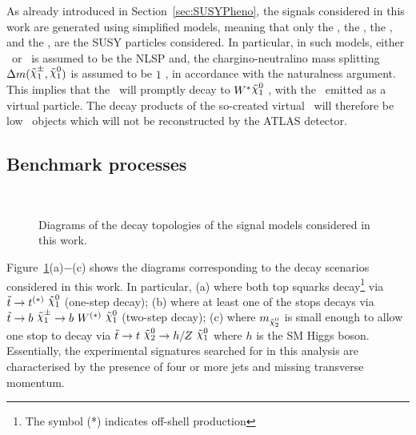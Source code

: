 		As already introduced in Section~\ref{sec:SUSYPheno}, the signals considered in this work are generated using simplified models, meaning that only the \stop, the \ninoone, the \ninotwo, and the \chinoonepm, are the \ac{SUSY} particles considered. In particular, in such models, either \ninotwo\ or \chinoonepm\ is assumed to be the \ac{NLSP} and, the chargino-neutralino mass splitting $\Delta m(\chinoonepm, \ninoone)$ is assumed to be $1$ \GeV, in accordance with the naturalness argument. This implies that the \chinoonepm\ will promptly decay to $\Wboson^*\ninoone$ , with the \Wboson\ emitted as a virtual particle. The decay products of the so-created virtual \Wboson\ will therefore be low \pt\ objects which will not be reconstructed by the \ac{ATLAS} detector. 

		\subsection{Benchmark processes}

			\begin{figure}[!htb]
				\centering
					\hspace{0.05\textwidth}
					\hspace{0.05\textwidth}
					\hspace{0.05\textwidth}\\
				\caption{Diagrams of the decay topologies of the signal models considered in this work.}
				\label{fig:stopModels}
			\end{figure}

			Figure~\ref{fig:stopModels}(a)$-$(c) shows the diagrams corresponding to the decay scenarios considered in this work. In particular, (a) where both top squarks decay\footnote{The symbol (*) indicates off-shell production} via $\stop\rightarrow t^{(*)}\ \ninoone$ (one-step decay); (b) where at least one of the stops decays via $\stop\rightarrow b\ \chinoonepm \rightarrow b\ \Wboson^{(*)}\ \ninoone$ (two-step decay); (c) where $m_{\ninotwo}$ is small enough to allow one stop to decay via $\stop\to t\ \ninotwo \to h/Z\ \ninoone$ where $h$ is the \ac{SM} Higgs boson. Essentially, the experimental signatures searched for in this analysis are characterised by the presence of four or more jets and missing transverse momentum. 

